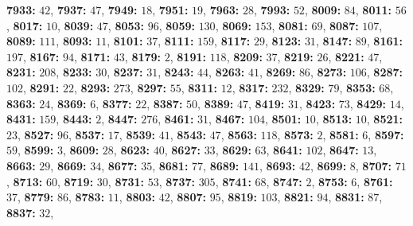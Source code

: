 \textsf{\bfseries 7933:} $42$, \textsf{\bfseries 7937:} $47$, \textsf{\bfseries 7949:} $18$, \textsf{\bfseries 7951:} $19$, \textsf{\bfseries 7963:} $28$, \textsf{\bfseries 7993:} $52$, \textsf{\bfseries 8009:} $84$, \textsf{\bfseries 8011:} $56$, \textsf{\bfseries 8017:} $10$, \textsf{\bfseries 8039:} $47$, \textsf{\bfseries 8053:} $96$, \textsf{\bfseries 8059:} $130$, \textsf{\bfseries 8069:} $153$, \textsf{\bfseries 8081:} $69$, \textsf{\bfseries 8087:} $107$, \textsf{\bfseries 8089:} $111$, \textsf{\bfseries 8093:} $11$, \textsf{\bfseries 8101:} $37$, \textsf{\bfseries 8111:} $159$, \textsf{\bfseries 8117:} $29$, \textsf{\bfseries 8123:} $31$, \textsf{\bfseries 8147:} $89$, \textsf{\bfseries 8161:} $197$, \textsf{\bfseries 8167:} $94$, \textsf{\bfseries 8171:} $43$, \textsf{\bfseries 8179:} $2$, \textsf{\bfseries 8191:} $118$, \textsf{\bfseries 8209:} $37$, \textsf{\bfseries 8219:} $26$, \textsf{\bfseries 8221:} $47$, \textsf{\bfseries 8231:} $208$, \textsf{\bfseries 8233:} $30$, \textsf{\bfseries 8237:} $31$, \textsf{\bfseries 8243:} $44$, \textsf{\bfseries 8263:} $41$, \textsf{\bfseries 8269:} $86$, \textsf{\bfseries 8273:} $106$, \textsf{\bfseries 8287:} $102$, \textsf{\bfseries 8291:} $22$, \textsf{\bfseries 8293:} $273$, \textsf{\bfseries 8297:} $55$, \textsf{\bfseries 8311:} $12$, \textsf{\bfseries 8317:} $232$, \textsf{\bfseries 8329:} $79$, \textsf{\bfseries 8353:} $68$, \textsf{\bfseries 8363:} $24$, \textsf{\bfseries 8369:} $6$, \textsf{\bfseries 8377:} $22$, \textsf{\bfseries 8387:} $50$, \textsf{\bfseries 8389:} $47$, \textsf{\bfseries 8419:} $31$, \textsf{\bfseries 8423:} $73$, \textsf{\bfseries 8429:} $14$, \textsf{\bfseries 8431:} $159$, \textsf{\bfseries 8443:} $2$, \textsf{\bfseries 8447:} $276$, \textsf{\bfseries 8461:} $31$, \textsf{\bfseries 8467:} $104$, \textsf{\bfseries 8501:} $10$, \textsf{\bfseries 8513:} $10$, \textsf{\bfseries 8521:} $23$, \textsf{\bfseries 8527:} $96$, \textsf{\bfseries 8537:} $17$, \textsf{\bfseries 8539:} $41$, \textsf{\bfseries 8543:} $47$, \textsf{\bfseries 8563:} $118$, \textsf{\bfseries 8573:} $2$, \textsf{\bfseries 8581:} $6$, \textsf{\bfseries 8597:} $59$, \textsf{\bfseries 8599:} $3$, \textsf{\bfseries 8609:} $28$, \textsf{\bfseries 8623:} $40$, \textsf{\bfseries 8627:} $33$, \textsf{\bfseries 8629:} $63$, \textsf{\bfseries 8641:} $102$, \textsf{\bfseries 8647:} $13$, \textsf{\bfseries 8663:} $29$, \textsf{\bfseries 8669:} $34$, \textsf{\bfseries 8677:} $35$, \textsf{\bfseries 8681:} $77$, \textsf{\bfseries 8689:} $141$, \textsf{\bfseries 8693:} $42$, \textsf{\bfseries 8699:} $8$, \textsf{\bfseries 8707:} $71$, \textsf{\bfseries 8713:} $60$, \textsf{\bfseries 8719:} $30$, \textsf{\bfseries 8731:} $53$, \textsf{\bfseries 8737:} $305$, \textsf{\bfseries 8741:} $68$, \textsf{\bfseries 8747:} $2$, \textsf{\bfseries 8753:} $6$, \textsf{\bfseries 8761:} $37$, \textsf{\bfseries 8779:} $86$, \textsf{\bfseries 8783:} $11$, \textsf{\bfseries 8803:} $42$, \textsf{\bfseries 8807:} $95$, \textsf{\bfseries 8819:} $103$, \textsf{\bfseries 8821:} $94$, \textsf{\bfseries 8831:} $87$, \textsf{\bfseries 8837:} $32$, 
